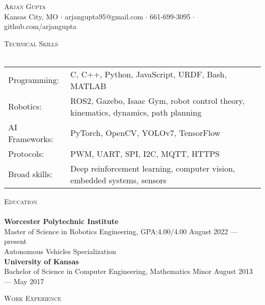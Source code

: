 \documentclass[a4paper]{article}
\newcommand{\lineunder} {
    \vspace*{-8pt} \\
    \hspace*{-18pt} \hrulefill \\
}
\newcommand{\header} [1] {
    {\hspace*{-18pt}\vspace*{6pt} \textsc{#1}}
    \vspace*{-6pt} \lineunder
}
\begin{document}
\vspace*{-40pt}

    

\vspace*{-10pt}
\begin{center}
	{\Huge \scshape {Arjan Gupta}}\\
	Kansas City, MO $\cdot$ arjangupta95@gmail.com $\cdot$ 661-699-3095 $\cdot$ github.com/arjangupta\\
\end{center}

\header{Technical Skills}
\vspace{2mm}
\begin{tabular}{ l l }
	Programming: & C, C++, Python, JavaScript, URDF, Bash, MATLAB \\
    Robotics: & ROS2, Gazebo, Isaac Gym, robot control theory, kinematics, dynamics, path planning \\
    AI Frameworks: & PyTorch, OpenCV, YOLOv7, TensorFlow \\
    Protocols:             & PWM, UART, SPI, I2C, MQTT,  HTTPS \\
    Broad skills: & Deep reinforcement learning, computer vision, embedded systems, sensors
\end{tabular}
\vspace{2mm}

\header{Education}
\textbf{Worcester Polytechnic Institute}\\
Master of Science in Robotics Engineering, GPA:\@ 4.00/4.00 \hfill August 2022 --- present\\
Autonomous Vehicles Specialization\\
\vspace{2mm}
\textbf{University of Kansas}\\
Bachelor of Science in Computer Engineering, Mathematics Minor \hfill August 2013 --- May 2017\\

\vspace{3mm}

\header{Work Experience}
\vspace{1mm}
\end{document}

